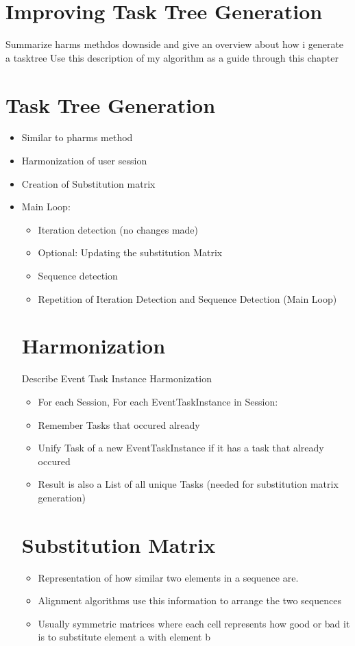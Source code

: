 \section{Improving Task Tree Generation}
Summarize harms methdos downside and give an overview about how i generate a tasktree
Use this description of my algorithm as a guide through this chapter
\section{Task Tree Generation}
	\begin{itemize}
		\item Similar to pharms method
		\item Harmonization of user session
		\item Creation of Substitution matrix
		\item Main Loop:
		\begin{itemize}
			\item Iteration detection (no changes made)
			\item Optional: Updating the substitution Matrix
			\item Sequence detection
		\item Repetition of Iteration Detection and Sequence Detection (Main Loop)
	\end{itemize}

\section{Harmonization}
Describe Event Task Instance Harmonization
\begin{itemize}
	\item For each Session, For each EventTaskInstance in Session:
	\item Remember Tasks that occured already
	\item Unify Task of a new EventTaskInstance if it has a task that already occured
	\item Result is also a List of all unique Tasks (needed for substitution matrix generation)
\end{itemize}

\section{Substitution Matrix}
	\begin{itemize}
		\item Representation of how similar two elements in a sequence are. 
		\item Alignment algorithms use this information to arrange the two sequences 
		\item Usually symmetric matrices where each cell represents how good or bad it is to substitute element a with element b  
	\end{itemize}

\end{itemize}
